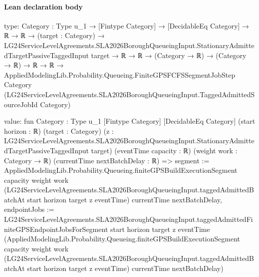 \documentclass[10pt]{article}
\begin{document}
\paragraph{Lean declaration body}
\begin{ReviewVerbatim}
type:
{Category : Type u_1} →
  [Fintype Category] →
    [DecidableEq Category] →
      ℝ →
        ℝ →
          (target : Category) →
            LG24ServiceLevelAgreements.SLA2026BoroughQueueingInput.StationaryAdmittedTargetPassiveTaggedInput target →
              ℝ →
                ℝ →
                  (Category → ℝ) →
                    (Category → ℝ) →
                      ℝ →
                        ℝ →
                          AppliedModelingLib.Probability.Queueing.FiniteGPSFCFSSegmentJobStep Category
                            (LG24ServiceLevelAgreements.SLA2026BoroughQueueingInput.TaggedAdmittedSourceJobId Category)

value:
fun {Category : Type u_1} [Fintype Category] [DecidableEq Category] (start horizon : ℝ) (target : Category)
    (z : LG24ServiceLevelAgreements.SLA2026BoroughQueueingInput.StationaryAdmittedTargetPassiveTaggedInput target)
    (eventTime capacity : ℝ) (weight work : Category → ℝ) (currentTime nextBatchDelay : ℝ) =>
  {
    segment :=
      AppliedModelingLib.Probability.Queueing.finiteGPSBuildExecutionSegment capacity weight work
        (LG24ServiceLevelAgreements.SLA2026BoroughQueueingInput.taggedAdmittedBatchAt start horizon target z eventTime)
        currentTime nextBatchDelay,
    endpointJobs :=
      LG24ServiceLevelAgreements.SLA2026BoroughQueueingInput.taggedAdmittedFiniteGPSEndpointJobsForSegment start horizon
        target z eventTime
        (AppliedModelingLib.Probability.Queueing.finiteGPSBuildExecutionSegment capacity weight work
          (LG24ServiceLevelAgreements.SLA2026BoroughQueueingInput.taggedAdmittedBatchAt start horizon target z
            eventTime)
          currentTime nextBatchDelay) }
\end{ReviewVerbatim}
\end{document}
